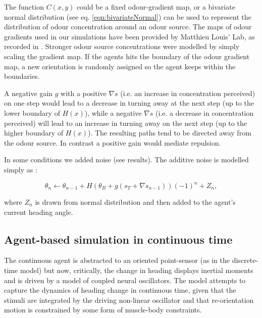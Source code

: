 \documentclass[11pt,a4paper]{article}
\begin{document}
The function $C(x,y)$ could be a fixed odour-gradient map, or a bivariate normal distribution (see eq. \eqref{eqn:bivariateNormal}) can be used to represent the distribution of odour concentration around an odour source. 
 The maps of odour gradients used in our simulations have been provided by Matthieu Louis' Lab, as recorded in \citep{gomez2014multilevel}. Stronger odour source concentrations were modelled by simply scaling the gradient map.
If the agents hits the boundary of the odour gradient map, a new  orientation is randomly assigned so the agent keeps within the boundaries.

A negative gain $g$ with a positive $\nabla s$ (i.e. an increase in concentration perceived) on one step would lead to a decrease in turning away at the next step (up to the lower boundary of $H(x)$), while a negative $\nabla s$ (i.e. a decrease in concentration perceived) will lead to an increase in turning away  on the next step (up to the higher boundary of $H(x)$).
 The resulting paths tend to be directed away from the odour source.
 In contrast a positive gain would mediate repulsion.

In some conditions we added noise (see results). The additive noise is modelled simply as :

\begin{equation}
\theta_{n} \leftarrow \theta_{n-1} + H(\theta_B + g (s_{T} + \nabla s_{n-1})){(-1)}^n + Z_n,
\end{equation}

where $Z_n$ is drawn from normal distribution and then added to the agent's current heading angle. 
 
\subsection{Agent-based simulation in continuous time}
\label{sec:methodsCoupledOscillator}
The continuous agent is abstracted to an oriented point-sensor (as in the discrete-time model) but now, critically, the change in heading  displays inertial moments and is driven by a model of coupled neural oscillators.
 The model attempts to capture the dynamics of heading change in continuous time, given that the stimuli are integrated by the driving non-linear oscillator and that re-orientation motion is constrained by some form of muscle-body constraints.
 
\end{document}
